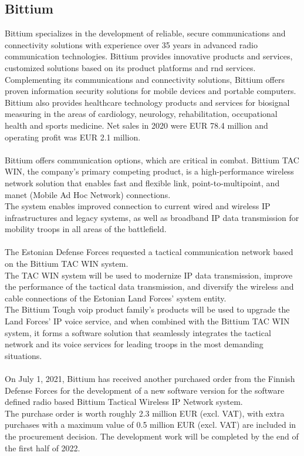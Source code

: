 \subsection{Bittium}
Bittium \cite{Bittium} specializes in the development of reliable, secure communications and connectivity solutions with experience over 35 years in advanced radio communication technologies. Bittium provides innovative products and services, customized solutions based on its product platforms and \acrfull{rnd} services. Complementing its communications and connectivity solutions, Bittium offers proven information security solutions for mobile devices and portable computers. Bittium also provides healthcare technology products and services for biosignal measuring in the areas of cardiology, neurology, rehabilitation, occupational health and sports medicine. Net sales in 2020 were EUR 78.4 million and operating profit was EUR 2.1 million.
\\
\\
Bittium offers communication options, which are critical in combat. Bittium TAC WIN, the company's primary competing product, is a high-performance wireless network solution that enables fast and flexible link, point-to-multipoint, and \acrshort{manet} (Mobile Ad Hoc Network) connections.
\\
The system enables improved connection to current wired and wireless IP infrastructures and legacy systems, as well as broadband IP data transmission for mobility troops in all areas of the battlefield. 
\\
\\
The Estonian Defense Forces requested a tactical communication network based on the Bittium TAC WIN system.
\\
The TAC WIN system will be used to modernize IP data transmission, improve the performance of the tactical data transmission, and diversify the wireless and cable connections of the Estonian Land Forces' system entity.
\\
The Bittium Tough \acrfull{voip} product family's products will be used to upgrade the Land Forces' IP voice service, and when combined with the Bittium TAC WIN system, it forms a software solution that seamlessly integrates the tactical network and its voice services for leading troops in the most demanding situations.
\\
\\
On July 1, 2021, Bittium has received another purchased order from the Finnish Defense Forces for the development of a new software version for the software defined radio based Bittium Tactical Wireless IP Network system.
\\
The purchase order is worth roughly 2.3 million EUR (excl. VAT), with extra purchases with a maximum value of 0.5 million EUR (excl. VAT) are included in the procurement decision.
The development work will be completed by the end of the first half of 2022.
